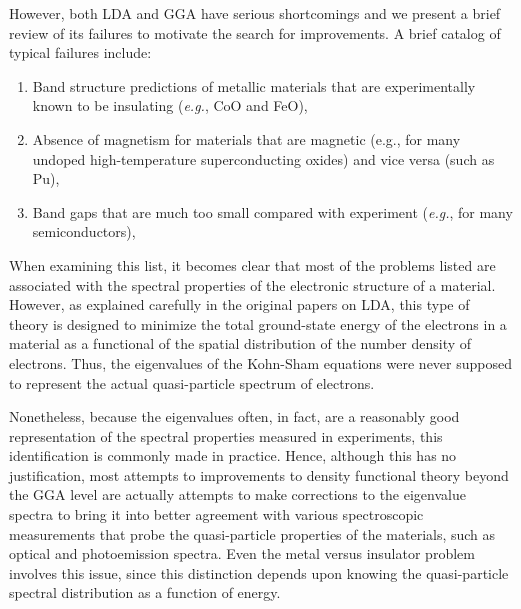\documentclass[book.tex]{subfiles}
\begin{document}
However, both LDA and GGA have serious shortcomings and we present a brief review of its failures to motivate the search for improvements.  A brief catalog of typical failures include:\cite{Albers:2009jq}
\begin{enumerate}
\item Band structure predictions of metallic materials that are experimentally known to be insulating (\textit{e.g.}, CoO and FeO), 
\item Absence of magnetism for materials that are magnetic (e.g., for many undoped high-temperature superconducting oxides) and vice versa (such as Pu), 
\item Band gaps that are much too small compared with experiment (\textit{e.g.}, for many semiconductors), 
\end{enumerate}
When examining this list, it becomes clear that most of the problems listed are associated with the spectral properties of the electronic structure of a material. However, as explained carefully in the original papers on LDA,\cite{hohenbergkohn:1964,kohnsham:1965} this type of theory is designed to minimize the total ground-state energy of the electrons in a material as a functional of the spatial distribution of the number density of electrons. Thus, the eigenvalues of the Kohn-Sham equations\cite{kohnsham:1965} were never supposed to represent the actual quasi-particle spectrum of electrons. 

Nonetheless, because the eigenvalues often, in fact, are a reasonably good representation of the spectral properties measured in experiments, this identification is commonly made in practice. Hence, although this has no justification, most attempts to improvements to density functional theory beyond the GGA level are actually attempts to make corrections to the eigenvalue spectra to bring it into better agreement with various spectroscopic measurements that probe the quasi-particle properties of the materials, such as optical and photoemission spectra. Even the metal versus insulator problem involves this issue, since this distinction depends upon knowing the quasi-particle spectral distribution as a function of energy.
\end{document}
